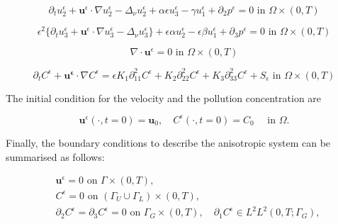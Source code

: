 \documentclass[11pt]{article}
\begin{document}
    \begin{equation} \label{ANSC2}
    \partial_t u_2^\epsilon + \mathbf{u}^\epsilon \cdot \nabla u_2^\epsilon -\Delta_\nu u_2^\epsilon + \alpha \epsilon u^\epsilon_3 - \gamma u_1^\epsilon + \partial_2 p^\epsilon = 0 \text{ in } \Omega \times (0,T)
    \end{equation}
    
    \begin{equation} \label{ANSC3}
    \epsilon^2 \{  \partial_t u_3^\epsilon + \mathbf{u}^\epsilon \cdot \nabla u_3^\epsilon -\Delta_\nu u_3^{\epsilon} \} + \epsilon \alpha u^\epsilon_2 - \epsilon \beta u_1^\epsilon + \partial_3 p^\epsilon = 0 \text{ in } \Omega \times (0,T)
    \end{equation}
    
    \begin{equation} \label{ANSC4}
    \nabla \cdot \mathbf{u}^\epsilon= 0 \text{ in } \Omega \times (0,T)
    \end{equation}
    
    \begin{equation} \label{ANSC5}
    \partial_t C^\epsilon + \mathbf{u^\epsilon} \cdot \nabla C^\epsilon = \epsilon K_1 \partial_{11} ^ 2 C^\epsilon + K_2 \partial_{22} ^ 2 C^\epsilon + K_3 \partial_{33} ^ 2 C^\epsilon + S_\epsilon \text{ in } \Omega \times (0,T)
    \end{equation}

The initial condition for the velocity and the pollution concentration are
    
    \begin{equation} \label{ANSC7}
    \mathbf{u}^\epsilon (\cdot, t = 0) = \mathbf{u}_0, \quad C^\epsilon (\cdot, t=0) = C_0  \quad \text{ in } \Omega.
    \end{equation}
  
  Finally, the boundary conditions to describe the anisotropic system can be summarised as follows:
  
    \begin{equation} \label{ANSC8}
      \begin{split}
        & \mathbf{u}^\epsilon = 0 \text{ on } \Gamma \times (0,T), \\
        &C^\epsilon = 0 \text{ on } ( \Gamma_U \cup \Gamma_L) \times (0,T), \\
        & \partial_2 C^\epsilon = \partial_3 C^\epsilon = 0 \text{ on } \Gamma_G \times (0,T), \quad \partial_1 C^\epsilon \in L^2 L^2 (0,T; \Gamma_G), \\
      \end{split}
    \end{equation}
    
\end{document}
